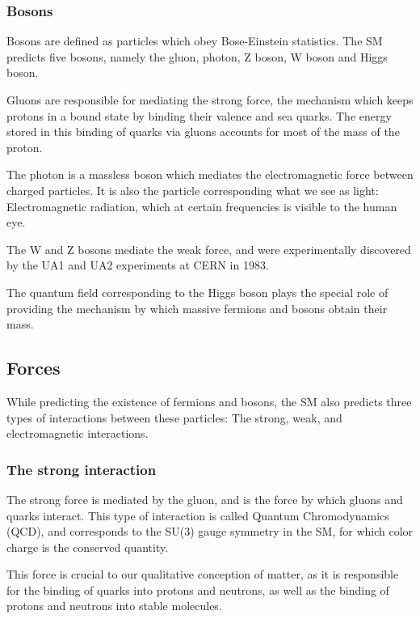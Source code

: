 \subsubsection{Bosons} \label{sec:bosons}

Bosons are defined as particles which obey Bose-Einstein statistics. The SM predicts five bosons, namely the gluon, photon, Z boson, W boson and Higgs boson. 

Gluons are responsible for mediating the strong force, the mechanism which keeps protons in a bound state by binding their valence and sea quarks. The energy stored in this binding of quarks via gluons accounts for most of the mass of the proton. 

The photon is a massless boson which mediates the electromagnetic force between charged particles. It is also the particle corresponding what we see as light: Electromagnetic radiation, which at certain frequencies is visible to the human eye. 


The W and Z bosons mediate the weak force, and were experimentally discovered by the UA1 and UA2 experiments at CERN in 1983.

The quantum field corresponding to the Higgs boson plays the special role of providing the mechanism by which massive fermions and bosons obtain their mass. 

\subsection{Forces}

While predicting the existence of fermions and bosons, the SM also predicts three types of interactions between these particles: The strong, weak, and electromagnetic interactions. 

\subsubsection{The strong interaction}

The strong force is mediated by the gluon, and is the force by which gluons and quarks interact. This type of interaction is called Quantum Chromodynamics (QCD), and corresponds to the SU(3) gauge symmetry in the SM, for which color charge is the conserved quantity. 

This force is crucial to our qualitative conception of matter, as it is responsible for the binding of quarks into protons and neutrons, as well as the binding of protons and neutrons into stable molecules. 

